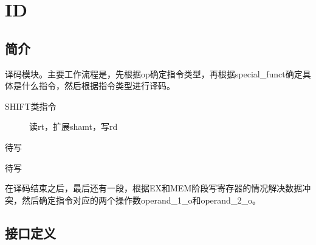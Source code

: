 \documentclass{article}
\begin{document}
\FloatBarrier

\section{ID}
\label{sec:ID}

\subsection{简介}

译码模块。主要工作流程是，先根据op确定指令类型，再根据special_funct确定具体是什么指令，然后根据指令类型进行译码。
\begin{description}
  \item [SPECIAL类指令]

    \begin{description}
      \item[SHIFT类指令] 读rt，扩展shamt，写rd
      \item[待写]
    \end{description}

  \item 待写
\end{description}

在译码结束之后，最后还有一段，根据EX和MEM阶段写寄存器的情况解决数据冲突，然后确定指令对应的两个操作数operand_1_o和operand_2_o。

\FloatBarrier
\subsection{接口定义}
\end{document}
